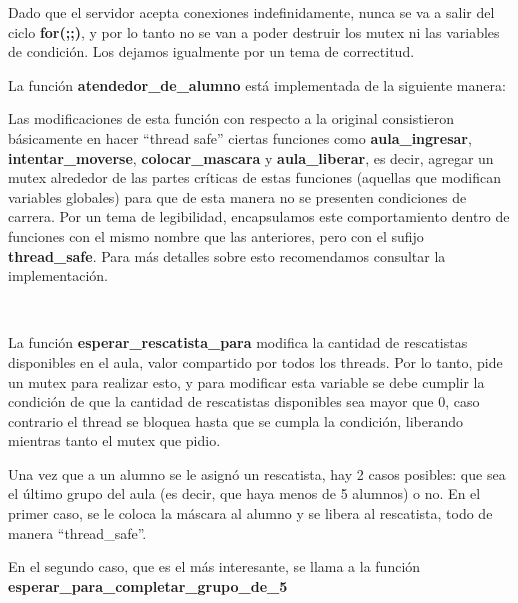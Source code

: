 Dado que el servidor acepta conexiones indefinidamente, nunca se va a salir del ciclo \textbf{for(;;)}, y por lo tanto no se van a poder destruir los mutex ni las variables de condici\'on. Los dejamos igualmente por un tema de correctitud.

\newpage
La funci\'on \textbf{atendedor\_de\_alumno} est\'a implementada de la siguiente manera: 




Las modificaciones de esta funci\'on con respecto a la original consistieron b\'asicamente en hacer ``thread safe'' ciertas funciones como \textbf{aula\_ingresar}, \textbf{intentar\_moverse}, \textbf{colocar\_mascara} y \textbf{aula\_liberar}, es decir, agregar un mutex alrededor de las 
partes cr\'iticas de estas funciones (aquellas que modifican variables globales) para que de esta manera no se presenten condiciones de carrera. Por un tema de legibilidad, encapsulamos este comportamiento dentro de funciones con el mismo nombre que las anteriores, pero
con el sufijo \textbf{thread\_safe}. Para m\'as detalles sobre esto recomendamos consultar la implementaci\'on.

~\\
\newline



La funci\'on \textbf{esperar\_rescatista\_para} modifica la cantidad de rescatistas disponibles en el aula, valor compartido por todos los threads. Por lo tanto, pide un mutex para realizar esto, y para modificar esta variable se debe cumplir la condici\'on de que 
la cantidad de rescatistas disponibles sea mayor que $0$, caso contrario el thread se bloquea hasta que se cumpla la condici\'on, liberando mientras tanto el mutex que pidio.




Una vez que a un alumno se le asign\'o un rescatista, hay 2 casos posibles: que sea el \'ultimo grupo del aula (es decir, que haya menos de 5 alumnos) o no. En el primer caso, se
le coloca la m\'ascara al alumno y se libera al rescatista, todo de manera ``thread\_safe''.

En el segundo caso, que es el m\'as interesante, se llama a la funci\'on \textbf{esperar\_para\_completar\_grupo\_de\_5}



